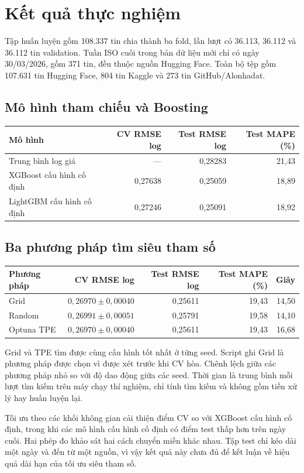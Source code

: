 \section{Kết quả thực nghiệm}
Tập huấn luyện gồm 108.337 tin chia thành ba fold, lần lượt có 36.113, 36.112 và 36.112 tin validation. Tuần ISO cuối trong bản dữ liệu mới chỉ có ngày 30/03/2026, gồm 371 tin, đều thuộc nguồn Hugging Face. Toàn bộ tệp gồm 107.631 tin Hugging Face, 804 tin Kaggle và 273 tin GitHub/Alonhadat.

\subsection{Mô hình tham chiếu và Boosting}
\begin{center}
\begin{tabular}{lrrr}
\toprule
Mô hình & CV RMSE log & Test RMSE log & Test MAPE (\%)\\
\midrule
Trung bình log giá & --- & 0,28283 & 21,43\\
XGBoost cấu hình cố định & 0,27638 & 0,25059 & 18,89\\
LightGBM cấu hình cố định & 0,27246 & 0,25091 & 18,92\\
\bottomrule
\end{tabular}
\end{center}

\subsection{Ba phương pháp tìm siêu tham số}
\begin{center}
\small
\begin{tabular}{lrrrr}
\toprule
Phương pháp & CV RMSE log & Test RMSE log & Test MAPE (\%) & Giây\\
\midrule
Grid & $0{,}26970 \pm 0{,}00040$ & 0,25611 & 19,43 & 14,50\\
Random & $0{,}26991 \pm 0{,}00051$ & 0,25791 & 19,58 & 14,10\\
Optuna TPE & $0{,}26970 \pm 0{,}00040$ & 0,25611 & 19,43 & 16,68\\
\bottomrule
\end{tabular}
\end{center}

Grid và TPE tìm được cùng cấu hình tốt nhất ở từng seed. Script ghi Grid là phương pháp được chọn vì được xét trước khi CV hòa. Chênh lệch giữa các phương pháp nhỏ so với độ dao động giữa các seed. Thời gian là trung bình mỗi lượt tìm kiếm trên máy chạy thí nghiệm, chỉ tính tìm kiếm và không gồm tiền xử lý hay huấn luyện lại.

Tối ưu theo các khối không gian cải thiện điểm CV so với XGBoost cấu hình cố định, trong khi các mô hình cấu hình cố định có điểm test thấp hơn trên ngày cuối. Hai phép đo khảo sát hai cách chuyển miền khác nhau. Tập test chỉ kéo dài một ngày và đến từ một nguồn, vì vậy kết quả này chưa đủ để kết luận về hiệu quả dài hạn của tối ưu siêu tham số.

